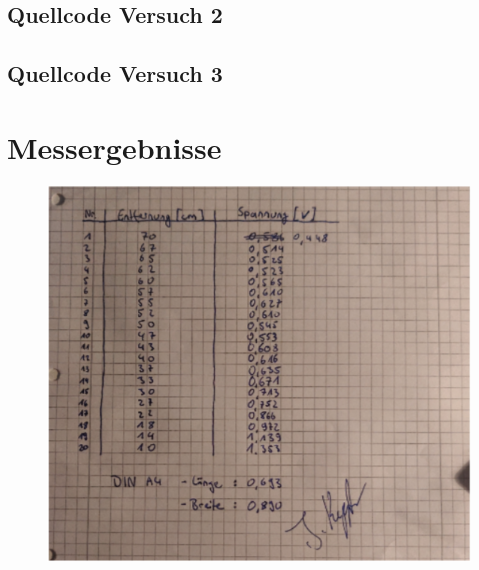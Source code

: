 \documentclass[12pt, oneside, a4paper, \docLanguage]{report}
\begin{document}
\subsection{Quellcode Versuch 2}
\label{chap:APPENDIX_SOURCECODE_V2}

\newpage
\subsection{Quellcode Versuch 3}
\label{chap:APPENDIX_SOURCECODE_V3}

\newpage
\section{Messergebnisse}
\label{chap:APPENDIX_MEASUREMENT_SOURCE}
\begin{figure}[h]
		\centering
		\includegraphics[scale=0.6]{media/messergebnisse.png}
\end{figure}
\end{document}
